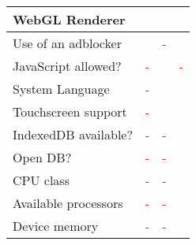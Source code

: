 \documentclass[
    fontsize=12pt,
    headings=small,
    parskip=half,
    bibliography=totoc,
    numbers=noenddot,
    open=any
]{scrreprt}
\newcommand{\cmark}{\textcolor{green}{\ding{51}}}
\newcommand{\xmark}{\textcolor{red}{-}}
\begin{document}
\begin{appendices}
\begin{tabular}{ l c c c }
    \hline
    WebGL Renderer & \cmark & \cmark & \cmark \\
    \hline
    Use of an adblocker & \cmark & \xmark & \cmark \\
    \hline
    JavaScript allowed? & \xmark & \cmark & \xmark \\
    \hline
    System Language & \xmark & \cmark & \cmark \\
    \hline
    Touchscreen support & \xmark & \cmark & \cmark \\
    \hline
    IndexedDB available? & \xmark & \xmark & \cmark \\
    \hline
    Open DB? & \xmark & \xmark & \cmark \\
    \hline
    CPU class & \xmark & \xmark & \cmark \\
    \hline
    Available processors & \xmark & \xmark & \cmark \\
    \hline
    Device memory & \xmark & \xmark & \cmark \\
    \hline
\end{tabular}

\end{appendices}

\clearpage

\printbibliography
\end{document}
